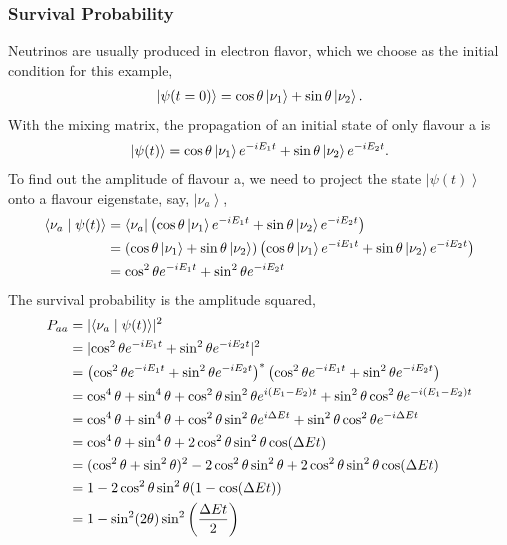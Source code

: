 \documentclass[letterpaper,12pt,english]{sphinxmanual}
\newcommand{\bra}[1]{\left\langle #1\right|}
\newcommand{\ket}[1]{\left| #1\right\rangle}
\newcommand{\braket}[2]{\langle #1 \mid #2 \rangle}
\begin{document}
\subsubsection{Survival Probability}
\label{oscillations:survival-probability}
Neutrinos are usually produced in electron flavor, which we choose as the initial condition for this example,
\begin{gather}
\begin{split}\ket{\psi(t=0)} = \cos\theta \ket{\nu_1} + \sin \theta \ket{\nu_2}.\end{split}\notag
\end{gather}
With the mixing matrix, the propagation of an initial state of only flavour a is
\begin{gather}
\begin{split}\ket{\psi(t)} = \cos\theta \ket{\nu_1} e^{-i E_1 t} + \sin\theta \ket{\nu_2} e^{-i E_2 t} .\end{split}\notag
\end{gather}
To find out the amplitude of flavour a, we need to project the state \(\ket{\psi(t)}\) onto a flavour eigenstate, say, \(\ket{\nu_a}\),
\begin{gather}
\begin{split}\braket{\nu_a}{\psi(t)} & = \bra{\nu_a}\left( \cos\theta \ket{\nu_1} e^{-i E_1 t} + \sin\theta \ket{\nu_2} e^{-i E_2 t}\right) \\
&= \left( \cos\theta \ket{\nu_1}  + \sin\theta \ket{\nu_2} \right) \left( \cos\theta \ket{\nu_1} e^{-i E_1 t} + \sin\theta \ket{\nu_2} e^{-i E_2 t}\right) \\
& = \cos^2\theta e^{-iE_1t} + \sin^2\theta e^{-i E_2 t}\end{split}\notag
\end{gather}
The survival probability is the amplitude squared,
\begin{gather}
\begin{split}P_{aa} & = \lvert \braket{\nu_a}{\psi(t)} \rvert ^2 \\
& = \lvert \cos^2\theta e^{-iE_1t} + \sin^2\theta e^{-i E_2 t}  \rvert^2 \\
& = \left( \cos^2\theta e^{-iE_1t} + \sin^2\theta e^{-i E_2 t}  \right)^* \left( \cos^2\theta e^{-iE_1t} + \sin^2\theta e^{-i E_2 t}  \right) \\
& = \cos^4\theta + \sin^4\theta + \cos^2\theta\sin^2\theta e^{i(E_1-E_2)t}+ \sin^2\theta\cos^2\theta e^{-i(E_1-E_2)t} \\
& = \cos^4\theta + \sin^4\theta + \cos^2\theta\sin^2\theta e^{i\Delta E t}+ \sin^2\theta\cos^2\theta e^{-i\Delta E t} \\
& = \cos^4\theta + \sin^4\theta + 2 \cos^2\theta\sin^2\theta \cos(\Delta E t) \\
& = (\cos^2\theta +\sin^2\theta)^2 - 2\cos^2\theta \sin^2\theta  + 2 \cos^2\theta\sin^2\theta \cos(\Delta E t) \\
& = 1 - 2 \cos^2\theta \sin^2\theta (1 - \cos(\Delta E t)) \\
& = 1 - \sin^2(2\theta) \sin^2\left( \frac{\Delta E t}{2} \right)\end{split}\notag
\end{gather}
\end{document}
